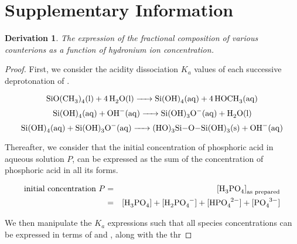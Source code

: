 \documentclass[10pt,twoside,a4paper]{article}
\newtheorem{thm}{Derivation}
\begin{document}
\section*{Supplementary Information}
     
    \begin{thm}The expression of the fractional composition of various counterions as a function of hydronium ion concentration.
    \end{thm}


	\begin{proof} First, we consider the acidity dissociation $K_a$ values of each successive deprotonation of .
	
		\begin{equation*}
 		\ce{SiO(CH3)4(l) + 4H2O(l) -> Si(OH)4(aq) + 4HOCH3(aq)}
 		\end{equation*}
 		\begin{equation*}
 		\ce{Si(OH)4(aq) + OH^-(aq) -> Si(OH)3O^-(aq) + H2O(l)}
 		\end{equation*}
 		\begin{equation*}
 		\ce{Si(OH)4(aq) + Si(OH)3O^-(aq) -> (HO)3Si-O-Si(OH)3(s) + OH^-(aq)}
 		\end{equation*}
 		
 	
 		
 	Thereafter, we consider that the initial concentration of phosphoric acid in aqueous solution $P$, can be expressed as
 	the sum of the concentration of phosphoric acid in all its forms.
 		
 		\begin{eqnarray}
 		\text{initial concentration } P & = & \ce{[H3PO4]}_\text{as prepared} \nonumber \\ 
 		& = & \ce{[H3PO4] + [H2PO4^-] + [HPO4^{2-}] + [PO4^{3-}]} \nonumber 		
 		\end{eqnarray}
 		
 	We then manipulate the $K_a$ expressions such that all species concentrations can be expressed in terms of \ce{[H_3PO_4]} and \ce{[H3O+]}, along with the thr

 		
	\end{proof}
	
\end{document}
